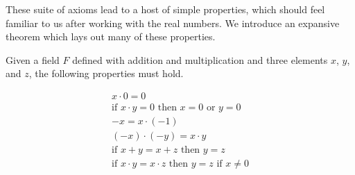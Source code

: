 \documentclass[twoside]{report}
\begin{document}
These suite of axioms lead to a host of simple properties, which should feel familiar to us after working with the real numbers. We introduce an expansive theorem which lays out many of these properties.

\vspace{\baselineskip}
\begin{theorem}
	Given a field $F$ defined with addition and multiplication and three elements $x$, $y$, and $z$, the following properties must hold.
	
	\begin{align}
		x \cdot 0 = 0 \\
		\text{if } x \cdot y = 0 \text{ then } x = 0 \text { or } y = 0 \\
		-x = x \cdot (-1) \\
		(-x) \cdot (-y) = x \cdot y \\
		\text{if } x + y = x + z \text{ then } y = z \\
		\text{if } x \cdot y = x \cdot z \text{ then } y = z \text { if } x \neq 0
	\end{align}
\end{theorem}
\end{document}
